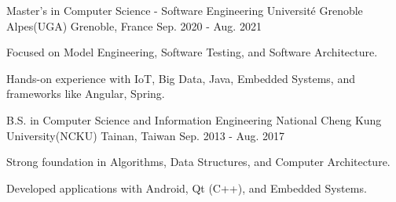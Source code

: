 

\begin{cventries}

  \cventry
    {Master's in Computer Science - Software Engineering} %
    {Université Grenoble Alpes(UGA)} %
    {Grenoble, France} %
    {Sep. 2020 - Aug. 2021} %
    {
      \begin{cvitems} %
        \item {Focused on Model Engineering, Software Testing, and Software Architecture.}
        \item {Hands-on experience with IoT, Big Data, Java, Embedded Systems, and frameworks like Angular, Spring.}
      \end{cvitems}
    }

  \cventry
    {B.S. in Computer Science and Information Engineering} %
    {National Cheng Kung University(NCKU)} %
    {Tainan, Taiwan} %
    {Sep. 2013 - Aug. 2017} %
    {
      \begin{cvitems} %
        \item {Strong foundation in Algorithms, Data Structures, and Computer Architecture.}
        \item {Developed applications with Android, Qt (C++), and Embedded Systems.}
      \end{cvitems}
    }

\end{cventries}
